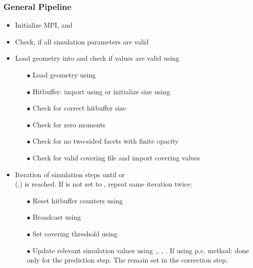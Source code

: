 \subsubsection{General Pipeline}
\begin{itemize}[noitemsep,topsep=0pt, partopsep=0pt]
\item Initialize MPI,  and 
\item Check, if all simulation parameters are valid
\item Load geometry into  and check if values are valid using 
	\begin{itemize}[noitemsep,topsep=0pt, partopsep=0pt]
		\item[$\bullet$] Load geometry using 
		\item[$\bullet$] Hitbuffer: import using   or initialize size using  
		\item[$\bullet$] Check for correct hitbuffer size
		\item[$\bullet$] Check for zero moments
		\item[$\bullet$] Check for no two-sided facets with finite opacity
		\item[$\bullet$] Check for valid covering file and import covering values
	\end{itemize}
\item{Iteration of simulation steps until  or\\  (,) is reached. If  is not set to , repeat same iteration twice: \smallskip}
	\begin{itemize}[noitemsep,topsep=0pt, partopsep=0pt]
	\item[$\bullet$] Reset hitbuffer counters using 
	\item[$\bullet$] Broadcast  using 
	\item[$\bullet$] Set covering threshold  using 
	\item[$\bullet$] Update relevant simulation values using ,\linebreak[4] , , . If using p.c. method: done only for the prediction step. The remain set in the correction step.

\end{itemize}
\end{itemize}

